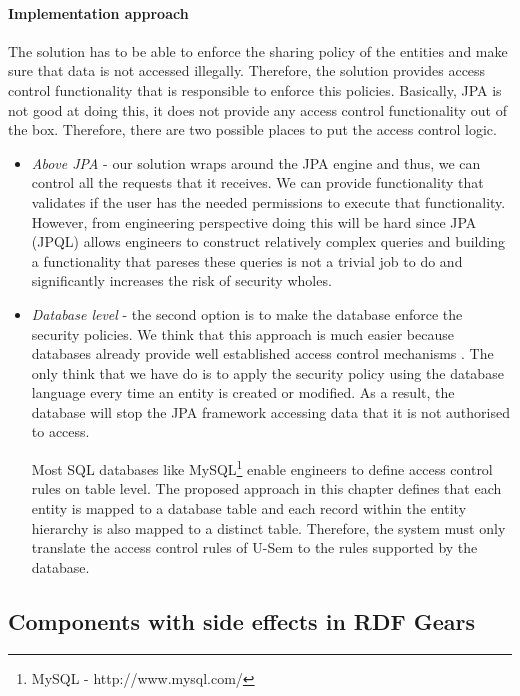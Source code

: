 \paragraph{Implementation approach}

The solution has to be able to enforce the sharing policy of the entities and make sure that data is not accessed illegally. Therefore, the solution provides access control functionality that is responsible to enforce this policies. Basically, JPA is not good at doing this, it does not provide any access control functionality out of the box. Therefore, there are two possible places to put the access control logic. 

\begin{itemize}
	\item \textit{Above JPA} - our solution wraps around the JPA engine and thus, we can control all the requests that it receives. We can provide functionality that validates if the user has the needed permissions to execute that functionality. However, from engineering perspective doing this will be hard since JPA (JPQL) allows engineers to construct relatively complex queries and building a functionality that pareses these queries is not a trivial job to do and significantly increases the risk of security wholes.
	
	\item \textit{Database level} - the second option is to make the database enforce the security policies. We think that this approach is much easier because databases already provide well established access control mechanisms \cite{olson2008formal}. The only think that we have do is to apply the security policy using the database language every time an entity is created or modified. As a result, the database will stop the JPA framework accessing data that it is not authorised to access.
	
	
Most SQL databases like MySQL\footnote{MySQL - http://www.mysql.com/} enable engineers to define access control rules on table level. The proposed approach in this chapter defines that each entity is mapped to a database table and each record within the entity hierarchy is also mapped to a distinct table. Therefore, the system must only translate the access control rules of U-Sem to the rules supported by the database.
\end{itemize}


\subsection{Components with side effects in RDF Gears}

